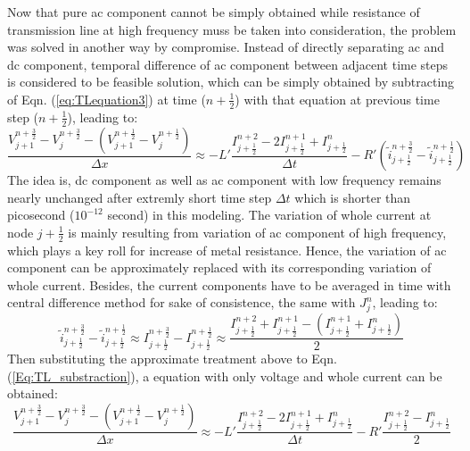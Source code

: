 \documentclass[11pt,final]{scrbook}
\begin{document}
Now that pure ac component cannot be simply obtained while resistance of transmission line at high frequency muss be taken into consideration, the problem was solved in another way by compromise. Instead of directly separating ac and dc component, temporal difference of ac component between adjacent time steps is considered to be feasible solution, which can be simply obtained by subtracting of Eqn. (\ref{eq:TLequation3}) at time ($n+\frac{1}{2}$) with that equation at previous time step ($n+\frac{1}{2}$), leading to:
\begin{equation}
\frac { { V }_{ j+1 }^{ n+\frac{3}{2} }-{ V }_{ j }^{ n+\frac{3}{2}}-({ V }_{ j+1 }^{ n+\frac{1}{2} }-{ V }_{ j }^{ n+\frac{1}{2} }) }{ \Delta x } \approx -L'\frac { { I }_{ j+\frac{1}{2} }^{ n+2 }-2{ I }_{ j+\frac{1}{2} }^{ n+1 }+{ I }_{ j+\frac{1}{2} }^{ n } }{ \Delta t } -R' (\widetilde{ i } _{ j+\frac{1}{2} }^{ n+\frac{3}{2} }-\widetilde{ i } _{ j+\frac{1}{2} }^{ n+\frac{1}{2} })\label{Eq:TL_substraction}
\end{equation}
The idea is, dc component as well as ac component with low frequency remains nearly unchanged after extremly short time step $\Delta t$ which is shorter than picosecond ($10^{-12}$ second) in this modeling. The variation of whole current at node $j+\frac{1}{2}$ is mainly resulting from variation of ac component of high frequency, which plays a key roll for increase of metal resistance. Hence, the variation of ac component can be approximately replaced with its corresponding variation of whole current. Besides, the current components have to be averaged in time with central difference method for sake of consistence, the same with $J_{j}^{n}$, leading to:
\begin{equation}
\tilde{ i }_{ j+\frac { 1 }{ 2 }  }^{ n+\frac{3}{2} }-\tilde{ i }_{ j+\frac { 1 }{ 2 }  }^{ n+\frac{1}{2} }\approx{ I }_{ j+\frac { 1 }{ 2 }  }^{ n+\frac{3}{2} }-{ I }_{ j+\frac { 1 }{ 2 }  }^{ n+\frac{1}{2} } \approx \frac{{ I }_{ j+\frac { 1 }{ 2 }  }^{ n+2 }+{ I }_{ j+\frac { 1 }{ 2 }  }^{ n+1 }-({ I }_{ j+\frac { 1 }{ 2 }  }^{ n+1 }+{ I }_{ j+\frac { 1 }{ 2 }  }^{ n })}{2}\label{Eq:ac_Current}
\end{equation}
Then substituting the approximate treatment above to Eqn. (\ref{Eq:TL_substraction}),  a equation with only voltage and whole current can be obtained:
\begin{equation}
\frac { { V }_{ j+1 }^{ n+\frac{3}{2} }-{ V }_{ j }^{ n+\frac{3}{2}}-({ V }_{ j+1 }^{ n+\frac{1}{2} }-{ V }_{ j }^{ n+\frac{1}{2} }) }{ \Delta x } \approx -L'\frac { { I }_{ j+\frac{1}{2} }^{ n+2 }-2{ I }_{ j+\frac{1}{2} }^{ n+1 }+{ I }_{ j+\frac{1}{2} }^{ n } }{ \Delta t } -R' \frac{{ I }_{ j+\frac { 1 }{ 2 }  }^{ n+2 }-{ I }_{ j+\frac { 1 }{ 2 }  }^{ n }}{2}
\end{equation}
\end{document}
